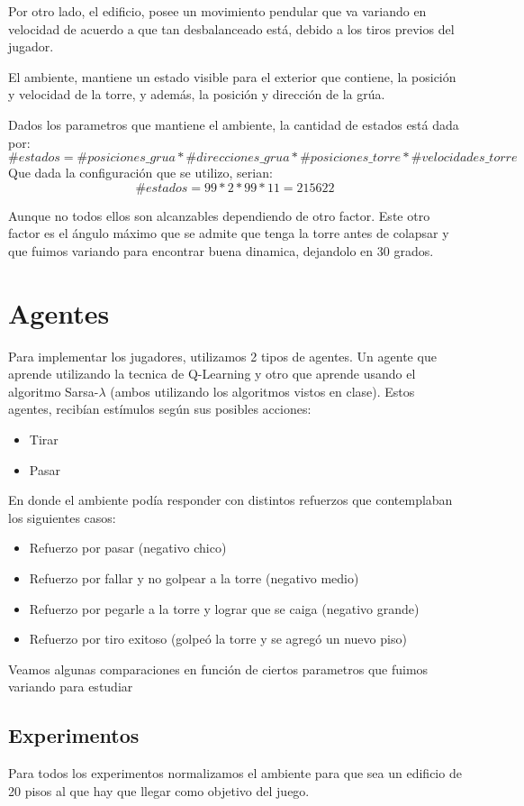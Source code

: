 \documentclass[11pt, a4paper]{article}
\newcommand{\slambda}{Sarsa-$\lambda$ }
\begin{document}
Por otro lado, el edificio, posee un movimiento pendular que va variando en velocidad de acuerdo a que tan desbalanceado est\'a, debido a los tiros previos del jugador. 

El ambiente, mantiene un estado visible para el exterior que contiene, la posici\'on y velocidad de la torre, y adem\'as, la posici\'on y direcci\'on de la gr\'ua. 

Dados los parametros que mantiene el ambiente, la cantidad de estados est\'a dada por:
$$ \#estados = \#posiciones\_grua * \#direcciones\_grua * \#posiciones\_torre *  \#velocidades\_torre  $$
Que dada la configuraci\'on que se utilizo, serian:
$$ \# estados = 99 * 2 * 99 * 11 = 215622 $$

Aunque no todos ellos son alcanzables dependiendo de otro factor. Este otro factor es el \'angulo m\'aximo que se admite que tenga la torre antes de colapsar y que fuimos variando para encontrar buena dinamica, dejandolo en 30 grados. 

\section{Agentes}
Para implementar los jugadores, utilizamos 2 tipos de agentes. Un agente que aprende utilizando la tecnica de Q-Learning y otro que aprende usando el algoritmo \slambda (ambos utilizando los algoritmos vistos en clase).
Estos agentes, recib\'ian est\'imulos seg\'un sus posibles acciones: 
\begin{itemize}
\item Tirar
\item Pasar
\end{itemize}
En donde el ambiente pod\'ia responder con distintos refuerzos que contemplaban los siguientes casos:
\begin{itemize}
\item Refuerzo por pasar (negativo chico)
\item Refuerzo por fallar y no golpear a la torre (negativo medio)
\item Refuerzo por pegarle a la torre y lograr que se caiga (negativo grande)
\item Refuerzo por tiro  exitoso (golpe\'o la torre y se agreg\'o un nuevo piso)
\end{itemize}


Veamos algunas comparaciones en funci\'on de ciertos parametros que fuimos variando para estudiar 
\subsection{Experimentos}
Para todos los experimentos normalizamos el ambiente para que sea un edificio de 20 pisos al que hay que llegar como objetivo del juego. 
\end{document}
